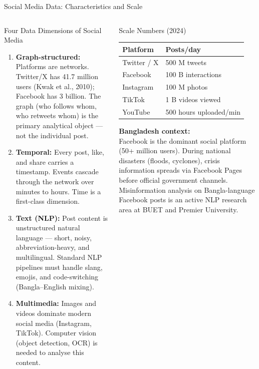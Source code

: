 \documentclass[aspectratio=169,10pt]{beamer}
\begin{document}
\begin{frame}{Social Media Data: Characteristics and Scale}
  \begin{columns}[T]
      \begin{block}{Four Data Dimensions of Social Media}
        \begin{enumerate}
          \item \textbf{Graph-structured:}  Platforms are networks.  Twitter/X has 41.7 million users (Kwak et al., 2010); Facebook has 3 billion.  The graph (who follows whom, who retweets whom) is the primary analytical object --- not the individual post.
          \item \textbf{Temporal:}  Every post, like, and share carries a timestamp.  Events cascade through the network over minutes to hours.  Time is a first-class dimension.
          \item \textbf{Text (NLP):}  Post content is unstructured natural language --- short, noisy, abbreviation-heavy, and multilingual.  Standard NLP pipelines must handle slang, emojis, and code-switching (Bangla--English mixing).
          \item \textbf{Multimedia:}  Images and videos dominate modern social media (Instagram, TikTok).  Computer vision (object detection, OCR) is needed to analyse this content.
        \end{enumerate}
      \end{block}

      \begin{exampleblock}{Scale Numbers (2024)}
        {\small
        \renewcommand{\arraystretch}{1.3}
        \begin{tabular}{p{2.2cm}p{2.4cm}}
          \toprule
          \textbf{Platform} & \textbf{Posts/day} \\
          \midrule
          Twitter / X    & 500 M tweets \\
          Facebook       & 100 B interactions \\
          Instagram      & 100 M photos \\
          TikTok         & 1 B videos viewed \\
          YouTube        & 500 hours uploaded/min \\
          \bottomrule
        \end{tabular}
        }
        \vspace{6pt}
        \textbf{Bangladesh context:}\\
        {\small Facebook is the dominant social platform (50+ million users).  During national disasters (floods, cyclones), crisis information spreads via Facebook Pages before official government channels.  Misinformation analysis on Bangla-language Facebook posts is an active NLP research area at BUET and Premier University.}
      \end{exampleblock}
  \end{columns}
\end{frame}
\end{document}
